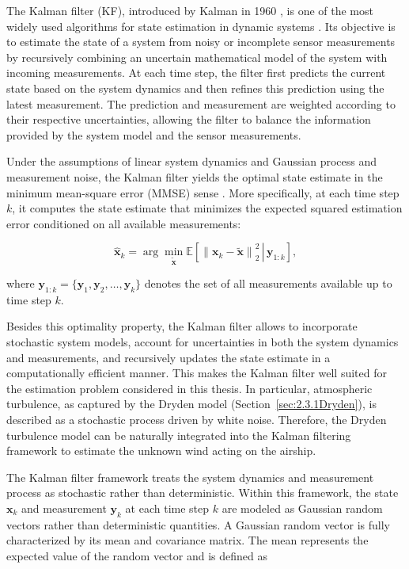 The Kalman filter (KF), introduced by Kalman in 1960 \cite{Kalman1960KF}, is one of the most widely used algorithms for state estimation in dynamic systems \cite{Maybeck1979KF, Särkkä2013KF}. Its objective is to estimate the state of a system from noisy or incomplete sensor measurements by recursively combining an uncertain mathematical model of the system with incoming measurements. At each time step, the filter first predicts the current state based on the system dynamics and then refines this prediction using the latest measurement. The prediction and measurement are weighted according to their respective uncertainties, allowing the filter to balance the information provided by the system model and the sensor measurements.

Under the assumptions of linear system dynamics and Gaussian process and measurement noise, the Kalman filter yields the optimal state estimate in the minimum mean-square error (MMSE) sense \cite{Simon2006KF}. More specifically, at each time step $k$, it computes the state estimate that minimizes the expected squared estimation error conditioned on all available measurements:

\begin{equation}
	\hat{\bm{x}}_{k}
	=
	\arg\min_{\tilde{\bm{x}}}
	\mathbb{E}
	\left[
	\left.
	\left\|
	\bm{x}_k-\tilde{\bm{x}}
	\right\|_2^2
	\,\right|\,
	\bm{y}_{1:k}
	\right],
	\label{eq:mmse}
\end{equation}

where $\bm{y}_{1:k}=\{\bm{y}_1,\bm{y}_2,\ldots,\bm{y}_k\}$ denotes the set of all measurements available up to time step $k$.

Besides this optimality property, the Kalman filter allows to incorporate stochastic system models, account for uncertainties in both the system dynamics and measurements, and recursively updates the state estimate in a computationally efficient manner. This makes the Kalman filter well suited for the estimation problem considered in this thesis. In particular, atmospheric turbulence, as captured by the Dryden model (Section~\ref{sec:2.3.1Dryden}), is described as a stochastic process driven by white noise. Therefore, the Dryden turbulence model can be naturally integrated into the Kalman filtering framework to estimate the unknown wind acting on the airship.

The Kalman filter framework treats the system dynamics and measurement process as stochastic rather than deterministic. Within this framework, the state $\bm{x}_k$ and measurement $\bm{y}_k$ at each time step $k$ are modeled as Gaussian random vectors rather than deterministic quantities. A Gaussian random vector is fully characterized by its mean and covariance matrix. The mean represents the expected value of the random vector and is defined as

